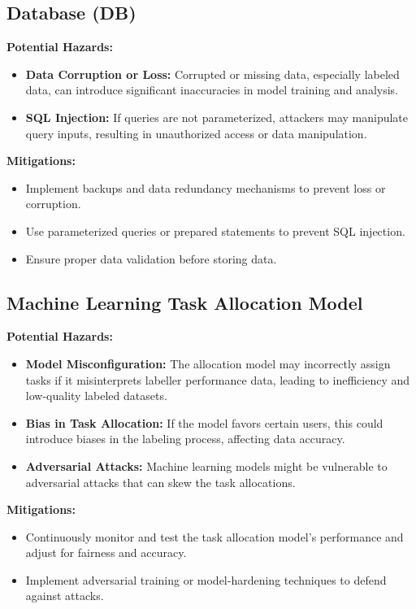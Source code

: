 \documentclass{article}
\begin{document}
\subsection{Database (DB)}
\textbf{Potential Hazards:}
\begin{itemize}
    \item \textbf{Data Corruption or Loss:} Corrupted or missing data, especially labeled data, can introduce significant inaccuracies in model training and analysis.
    \item \textbf{SQL Injection:} If queries are not parameterized, attackers may manipulate query inputs, resulting in unauthorized access or data manipulation.
\end{itemize}
\textbf{Mitigations:}
\begin{itemize}
    \item Implement backups and data redundancy mechanisms to prevent loss or corruption.
    \item Use parameterized queries or prepared statements to prevent SQL injection.
    \item Ensure proper data validation before storing data.
\end{itemize}

\subsection{Machine Learning Task Allocation Model}
\textbf{Potential Hazards:}
\begin{itemize}
    \item \textbf{Model Misconfiguration:} The allocation model may incorrectly assign tasks if it misinterprets labeller performance data, leading to inefficiency and low-quality labeled datasets.
    \item \textbf{Bias in Task Allocation:} If the model favors certain users, this could introduce biases in the labeling process, affecting data accuracy.
    \item \textbf{Adversarial Attacks:} Machine learning models might be vulnerable to adversarial attacks that can skew the task allocations.
\end{itemize}
\textbf{Mitigations:}
\begin{itemize}
    \item Continuously monitor and test the task allocation model’s performance and adjust for fairness and accuracy.
    \item Implement adversarial training or model-hardening techniques to defend against attacks.
\end{itemize}
\end{document}
